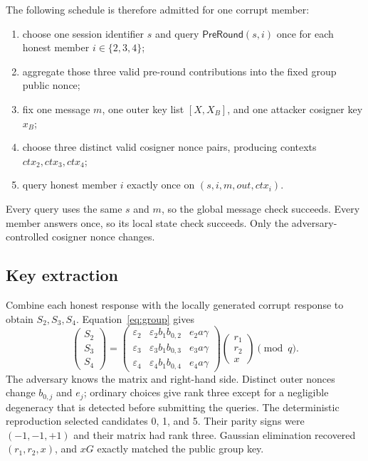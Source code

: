\documentclass[10pt,a4paper]{article}
\newcommand{\PreRound}{\mathsf{PreRound}}
\begin{document}
The following schedule is therefore admitted for one corrupt member:
\begin{enumerate}
  \item choose one session identifier $s$ and query $\PreRound(s,i)$ once for
        each honest member $i\in\{2,3,4\}$;
  \item aggregate those three valid pre-round contributions into the fixed
        group public nonce;
  \item fix one message $m$, one outer key list $[X,X_B]$, and one attacker
        cosigner key $x_B$;
  \item choose three distinct valid cosigner nonce pairs, producing contexts
        $\mathit{ctx}_2,\mathit{ctx}_3,\mathit{ctx}_4$;
  \item query honest member $i$ exactly once on
        $(s,i,m,\mathit{out},\mathit{ctx}_i)$.
\end{enumerate}
Every query uses the same $s$ and $m$, so the global message check succeeds.
Every member answers once, so its local state check succeeds. Only the
adversary-controlled cosigner nonce changes.

\subsection{Key extraction}

Combine each honest response with the locally generated corrupt response to
obtain $S_2,S_3,S_4$. Equation~\eqref{eq:group} gives
\[
\begin{pmatrix}S_2\\S_3\\S_4\end{pmatrix}
=
\begin{pmatrix}
\varepsilon_2 & \varepsilon_2b_1b_{0,2} & e_2a\gamma\\
\varepsilon_3 & \varepsilon_3b_1b_{0,3} & e_3a\gamma\\
\varepsilon_4 & \varepsilon_4b_1b_{0,4} & e_4a\gamma
\end{pmatrix}
\begin{pmatrix}r_1\\r_2\\x\end{pmatrix}
\pmod q.
\]
The adversary knows the matrix and right-hand side. Distinct outer nonces
change $b_{0,j}$ and $e_j$; ordinary choices give rank three except for a
negligible degeneracy that is detected before submitting the queries. The
deterministic reproduction selected candidates 0, 1, and 5. Their parity signs
were $(-1,-1,+1)$ and their matrix had rank three. Gaussian elimination
recovered $(r_1,r_2,x)$, and $xG$ exactly matched the public group key.
\end{document}
